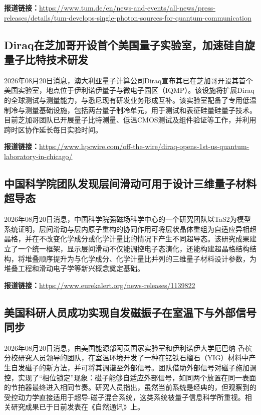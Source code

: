 \documentclass[12pt,a4paper]{ctexart}
\begin{document}
\noindent\textbf{报道链接：}\url{https://www.tum.de/en/news-and-events/all-news/press-releases/details/tum-develops-single-photon-sources-for-quantum-communication}

\subsection{ Diraq在芝加哥开设首个美国量子实验室，加速硅自旋量子比特技术研发 }

2026年08月20日消息，澳大利亚量子计算公司Diraq宣布其已在芝加哥开设其首个美国实验室，地点位于伊利诺伊量子与微电子园区（IQMP）。该设施将扩展Diraq的全球测试与测量能力，与悉尼现有研发业务形成互补。该实验室配备了专用低温制冷与测量基础设施，包括两台量子制冷单元，用于测试和表征硅量硅量子技术。目前芝加哥团队已开展量子比特测量、低温CMOS测试及组件验证等工作，并利用跨时区协作延长每日实验时间。

\noindent\textbf{报道链接：}\url{https://www.hpcwire.com/off-the-wire/diraq-opens-1st-us-quantum-laboratory-in-chicago/}

\subsection{ 中国科学院团队发现层间滑动可用于设计三维量子材料超导态 }

2026年08月20日消息，中国科学院强磁场科学中心的一个研究团队以TaS2为模型系统证明，层间滑动与层内原子重构的协同作用可将层状晶体重组为自适应异相超晶格，并在不改变化学成分或化学计量比的情况下产生不同超导态。该研究成果建立了一个统一框架，显示层间滑动不仅能调控电子态演化，还能构建超晶格结构结构，将堆叠顺序提升为与化学成分、化学计量比并列的三维量子材料设计参数，为堆叠工程和滑动电子学等新兴概念奠定基础。

\noindent\textbf{报道链接：}\url{https://www.eurekalert.org/news-releases/1139822}

\subsection{ 美国科研人员成功实现自发磁振子在室温下与外部信号同步 }

2026年08月20日消息，由美国能源部阿贡国家实验室和伊利诺伊大学厄巴纳-香槟分校研究人员领导的团队，在室温环境开发了一种在钇铁石榴石（YIG）材料中产生自发磁子的新方法，并可将其调谐至外部信号。团队借助外部信号对磁子施加调控，实现了“相位锁定”现象：磁子能够自适应外部信号，如同两个放置在同一表面的节拍器最终进入相同节奏。研究人员指出，虽然当前系统是经典的，但观察到的受控动力学直接适用于超导-磁子混合系统，这类系统被量子信息科学所重视。相关研究成果已于日前发表在《自然通讯》上。
\end{document}
